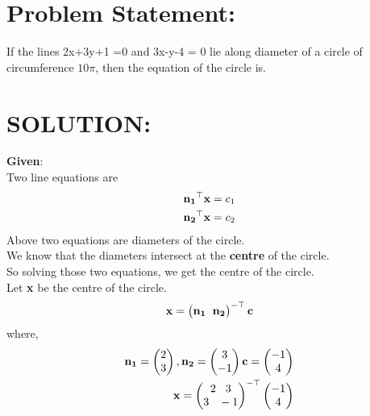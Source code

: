 \documentclass[10pt,a4paper]{report}
\newcommand{\myvec}[1]{\ensuremath{\begin{pmatrix}#1\end{pmatrix}}}
\let\vec\mathbf
\let\vec\mathbf
\begin{document}
\begin{multicols}{2}

\raggedright \section{Problem Statement:}%
\raggedright
 If the lines 2x+3y+1 =0 and 3x-y-4 = 0 lie along diameter of a circle of circumference $10\pi$, then the equation of the circle is. \\
\vspace{5mm}
\raggedright \section{SOLUTION:}\vspace{2mm}

\raggedright \textbf{Given}:\vspace{2mm}\\
Two line equations are \\\vspace{1mm}
\begin{align}
\vspace{1mm}
\vec{n_1}^\top\textbf{x}={c_1}
\\
\vec{n_2}^\top\textbf{x}={c_2}
\end{align}
Above two equations are diameters of the circle.\\ \vspace{1mm}
We know that the diameters intersect at the \textbf{centre} of the circle.\\
So solving those two equations, we get the centre of the circle.
\\
Let \textbf{x} be the centre of the circle.
\begin{align}
 \textbf{x} = 
 \myvec{
\vec{n_1} \hspace{2mm} \vec{n_2} \\
}^{-\top}\vec{c}
\end{align}
where,
\begin{align}
\vec{n_1}=\myvec{2 \\ 3} ,\vec{n_2}=\myvec{3 \\-1} \textbf{c}=\myvec{-1 \\4}
\\
 \textbf{x} =
 \myvec{
2 \hspace{3mm} 3 \\
3 \hspace{3mm} -1 \\
}^{-\top}
\myvec{
      -1\\
      4
  }
\end{align}


\end{multicols}
\end{document}
